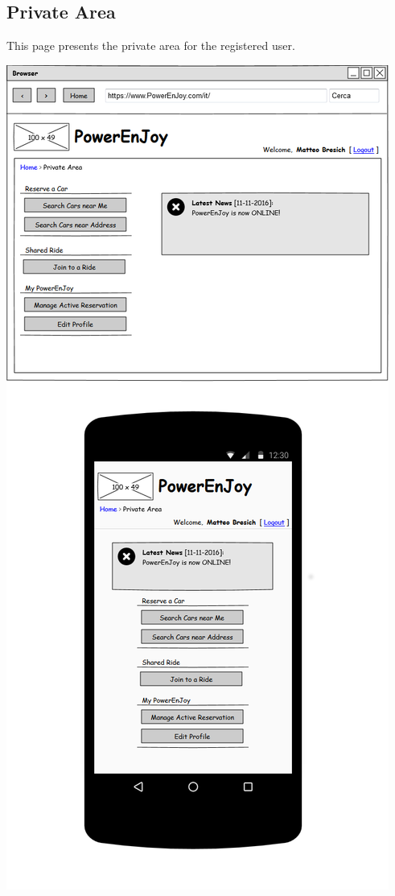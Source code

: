 \subsection{Private Area} This page presents the private area for the registered user.
\begin{center}
	\includegraphics[width=0.6\linewidth]{"img/ui/private-area"}
\end{center}
\pagebreak


